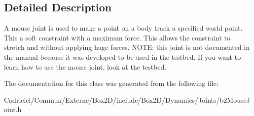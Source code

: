 \subsection{Detailed Description}
A mouse joint is used to make a point on a body track a specified world point. This a soft constraint with a maximum force. This allows the constraint to stretch and without applying huge forces. N\+O\+TE\+: this joint is not documented in the manual because it was developed to be used in the testbed. If you want to learn how to use the mouse joint, look at the testbed. 

The documentation for this class was generated from the following file\+:\begin{DoxyCompactItemize}
\item 
Cadriciel/\+Commun/\+Externe/\+Box2\+D/include/\+Box2\+D/\+Dynamics/\+Joints/b2\+Mouse\+Joint.\+h\end{DoxyCompactItemize}

